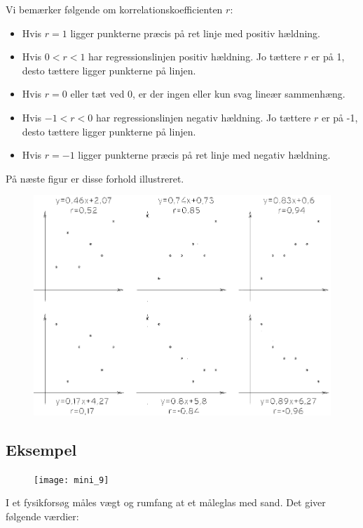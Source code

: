 \documentclass[12pt,oneside,a4paper]{article}
\begin{document}
Vi bemærker følgende om korrelationskoefficienten $r$:

\begin{itemize}
    \item Hvis $r = 1$ ligger punkterne præcis på ret linje med positiv hældning.
    \item Hvis $0 < r < 1$ har regressionslinjen positiv hældning. Jo tættere $r$
        er på 1, desto tættere ligger punkterne på linjen.
    \item Hvis $r = 0$ eller tæt ved 0, er der ingen eller kun svag lineær sammenhæng.
    \item Hvis $-1 < r < 0$ har regressionslinjen negativ hældning. Jo tættere $r$
        er på -1, desto tættere ligger punkterne på linjen.
    \item Hvis $r = -1$ ligger punkterne præcis på ret linje med negativ hældning. 
\end{itemize}
På næste figur er disse forhold illustreret.

\begin{figure}[H]
    \centering
    \includegraphics[width=\textwidth]{fig57}
    \caption{}
\end{figure}

\subsection{Eksempel}
\begin{figure}[H]
    \centering
    \texttt{[image: mini\_9]}
    \caption{}
\end{figure}
I et fysikforsøg måles vægt og rumfang at et måleglas med sand. Det giver følgende værdier:
\end{document}
